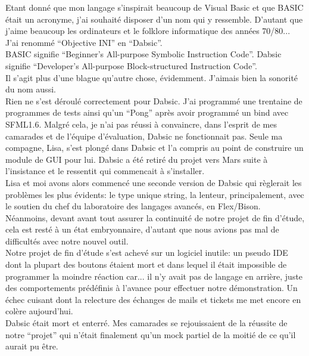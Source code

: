 \documentclass[a5paper, 12pt]{book}
\begin{document}
Etant donné que mon langage s'inspirait
beaucoup de Visual Basic et que BASIC était un acronyme, j'ai
souhaité disposer d'un nom qui y ressemble. D'autant que
j'aime beaucoup les ordinateurs et le folklore informatique
des années 70/80... J'ai renommé ``Objective INI'' en ``Dabsic''.\\

BASIC signifie ``Beginner's All-purpose Symbolic Instruction Code''.
Dabsic signifie ``Developer's All-purpose Block-structured Instruction Code''.\\

Il s'agit plus d'une blague qu'autre chose, évidemment. J'aimais
bien la sonorité du nom aussi.\\

Rien ne s'est déroulé correctement pour Dabsic. J'ai programmé
une trentaine de programmes de tests ainsi qu'un ``Pong'' après
avoir programmé un bind avec SFML1.6. Malgré cela, je n'ai
pas réussi à convaincre, dans l'esprit de mes camarades et
de l'équipe d'évaluation, Dabsic ne fonctionnait pas. Seule
ma compagne, Lisa, s'est plongé dans Dabsic et l'a compris
au point de construire un module de GUI pour lui. Dabsic
a été retiré du projet vers Mars suite à l'insistance et le
ressentit qui commencait à s'installer.\\

Lisa et moi avons alors commencé une seconde version de Dabsic
qui règlerait les problèmes les plus évidents: le type unique string,
la lenteur, principalement, avec le soutien du chef du laboratoire
des langages avancés, en Flex/Bison. Néanmoins, devant avant
tout assurer la continuité de notre projet de fin d'étude, cela
est resté à un état embryonnaire, d'autant que nous avions
pas mal de difficultés avec notre nouvel outil.\\

Notre projet de fin d'étude s'est achevé sur un logiciel
inutile: un pseudo IDE dont la plupart des boutons étaient
mort et dans lequel il était impossible de programmer la moindre
réaction car... il n'y avait pas de langage en arrière, juste
des comportements prédéfinis à l'avance pour effectuer notre
démonstration. Un échec cuisant dont la relecture des échanges
de mails et tickets me met encore en colère aujourd'hui.\\

Dabsic était mort et enterré. Mes camarades se rejouissaient
de la réussite de notre ``projet'' qui n'était finalement
qu'un mock partiel de la moitié de ce qu'il aurait pu être.\\
\end{document}
